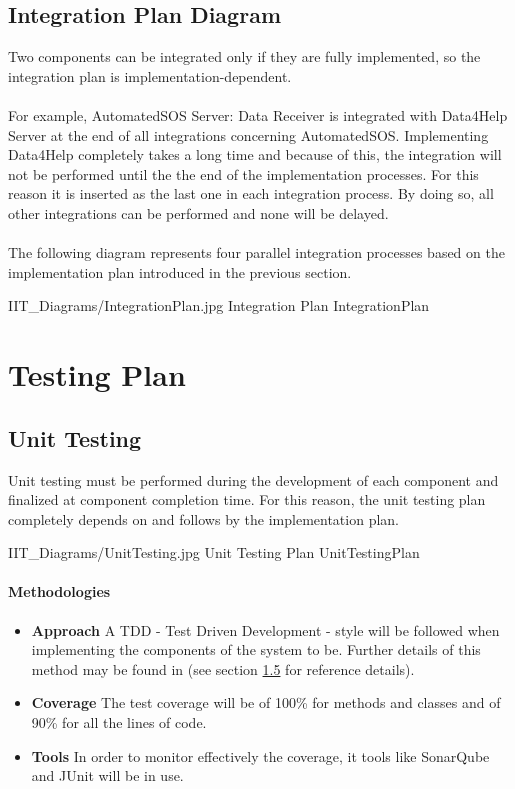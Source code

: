 \documentclass[../DD.tex]{subfiles}
\begin{document}
\subsection{Integration Plan Diagram}
Two components can be integrated only if they are fully implemented, so the integration plan is implementation-dependent.\\ \\
For example, AutomatedSOS Server: Data Receiver is integrated with Data4Help Server at the end of all integrations concerning AutomatedSOS. Implementing Data4Help completely takes a long time and because of this, the integration will not be performed until the the end of the implementation processes. For this reason it is inserted as the last one in each integration process. By doing so, all other integrations can be performed and none will be delayed.\\\\
The following diagram represents four parallel integration processes based on the implementation plan introduced in the previous section.

\image {13cm} {IIT_Diagrams/IntegrationPlan.jpg} {Integration Plan} {IntegrationPlan}

\newpage
\section{Testing Plan}
\subsection{Unit Testing}
Unit testing must be performed during the development of each component and finalized at component completion time. For this reason, the unit testing plan completely depends on and follows by the implementation plan.

\image {13cm} {IIT_Diagrams/UnitTesting.jpg} {Unit Testing Plan} {UnitTestingPlan}

\paragraph{Methodologies}
\begin{itemize}
	\item\textbf{Approach} A TDD - Test Driven Development - style will be followed when implementing the components of the system to be. Further details of this method may be found in  (see section \hyperref[sect:1.5]{1.5} for reference details).
	\item\textbf{Coverage} The test coverage will be of 100\% for methods and classes and of 90\% for all the lines of code.
	\item\textbf{Tools} In order to monitor effectively the coverage, it tools like SonarQube and JUnit will be in use.
\end{itemize} 
\newpage
\end{document}
